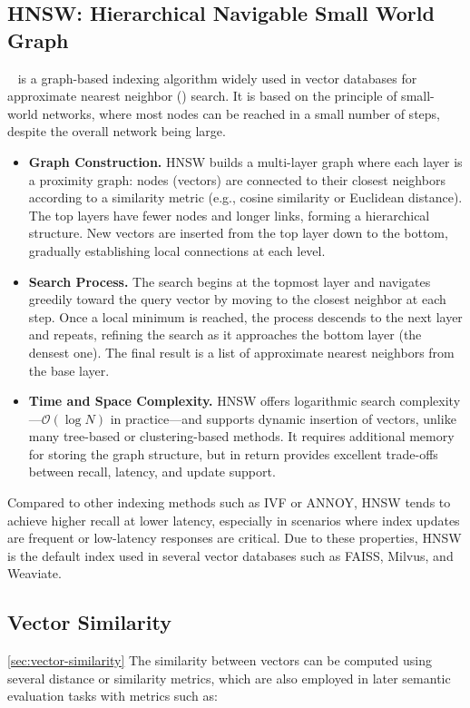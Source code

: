 \subsection{HNSW: Hierarchical Navigable Small World Graph}

~\cite{malkov2018efficient} is a graph-based indexing algorithm widely used in vector databases for approximate nearest neighbor () search. It is based on the principle of small-world networks, where most nodes can be reached in a small number of steps, despite the overall network being large.

\begin{itemize}
    \item \textbf{Graph Construction.} HNSW builds a multi-layer graph where each layer is a proximity graph: nodes (vectors) are connected to their closest neighbors according to a similarity metric (e.g., cosine similarity or Euclidean distance). The top layers have fewer nodes and longer links, forming a hierarchical structure. New vectors are inserted from the top layer down to the bottom, gradually establishing local connections at each level.

    \item \textbf{Search Process.} The search begins at the topmost layer and navigates greedily toward the query vector by moving to the closest neighbor at each step. Once a local minimum is reached, the process descends to the next layer and repeats, refining the search as it approaches the bottom layer (the densest one). The final result is a list of approximate nearest neighbors from the base layer.

    \item \textbf{Time and Space Complexity.} HNSW offers logarithmic search complexity—$\mathcal{O}(\log N)$ in practice—and supports dynamic insertion of vectors, unlike many tree-based or clustering-based methods. It requires additional memory for storing the graph structure, but in return provides excellent trade-offs between recall, latency, and update support.
\end{itemize}

Compared to other indexing methods such as IVF or ANNOY, HNSW tends to achieve higher recall at lower latency, especially in scenarios where index updates are frequent or low-latency responses are critical. Due to these properties, HNSW is the default index used in several vector databases such as FAISS, Milvus, and Weaviate.

\subsection{Vector Similarity}
\ref{sec:vector-similarity}
The similarity between vectors can be computed using several distance or similarity metrics, which are also employed in later semantic evaluation tasks with metrics such as:

